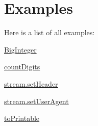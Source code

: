 \section{Examples}
Here is a list of all examples\+:\begin{DoxyCompactItemize}
\item 
\mbox{\hyperlink{BigInteger-example}{Big\+Integer}}
\item 
\mbox{\hyperlink{countDigits-example}{count\+Digits}}
\item 
\mbox{\hyperlink{stream_8setHeader-example}{stream.\+set\+Header}}
\item 
\mbox{\hyperlink{stream_8setUserAgent-example}{stream.\+set\+User\+Agent}}
\item 
\mbox{\hyperlink{toPrintable-example}{to\+Printable}}
\end{DoxyCompactItemize}
